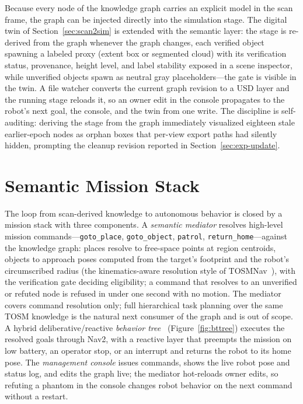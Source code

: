 Because every node of the knowledge graph carries an explicit model in the
scan frame, the graph can be injected directly into the simulation stage. The
digital twin of Section~\ref{sec:scan2sim} is extended with the semantic
layer: the stage is re-derived from the graph whenever the graph changes, each
verified object spawning a labeled proxy (extent box or segmented cloud) with
its verification status, provenance, height level, and label stability exposed
in a scene inspector, while unverified objects spawn as neutral gray
placeholders---the gate is visible in the twin. A file watcher converts the
current graph revision to a USD layer and the running stage reloads it, so an
owner edit in the console propagates to the robot's next goal, the console,
and the twin from one write. The discipline is self-auditing: deriving the
stage from the graph immediately visualized eighteen stale earlier-epoch nodes
as orphan boxes that per-view export paths had silently hidden, prompting the
cleanup revision reported in Section~\ref{sec:exp-update}.

\section{Semantic Mission Stack}
\label{sec:missions}

The loop from scan-derived knowledge to autonomous behavior is closed by a
mission stack with three components. A \emph{semantic mediator} resolves
high-level mission commands---\texttt{goto\_place}, \texttt{goto\_object},
\texttt{patrol}, \texttt{return\_home}---against the knowledge graph: places
resolve to free-space points at region centroids, objects to approach poses
computed from the target's footprint and the robot's circumscribed radius (the
kinematics-aware resolution style of TOSMNav~\cite{joo2022fsom}), with the
verification gate deciding eligibility; a command that resolves to an
unverified or refuted node is refused in under one second with no motion. The
mediator covers command resolution only; full hierarchical task planning over
the same TOSM knowledge is the natural next consumer of the graph and is out
of scope. A hybrid deliberative/reactive \emph{behavior
tree}~\cite{colledanchise2018bt,iovino2022btsurvey} (Figure~\ref{fig:bttree})
executes the resolved goals through Nav2, with a reactive layer that preempts
the mission on low battery, an operator stop, or an interrupt and returns the
robot to its home pose. The \emph{management console} issues commands, shows
the live robot pose and status log, and edits the graph live; the mediator
hot-reloads owner edits, so refuting a phantom in the console changes robot
behavior on the next command without a restart.

